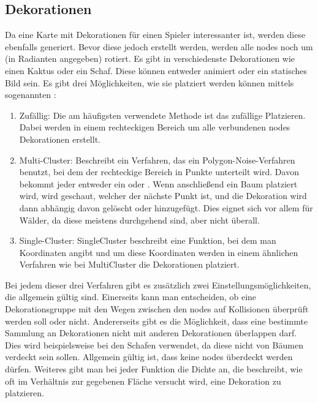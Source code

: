 \subsection{Dekorationen}\label{subsec:dekorationen}
Da eine Karte mit Dekorationen für einen Spieler interessanter ist, werden diese ebenfalls generiert.
Bevor diese jedoch erstellt werden, werden alle nodes noch um  (in Radianten angegeben) rotiert.
Es gibt in \FF verschiedenste Dekorationen wie einen Kaktus oder ein Schaf.
Diese können entweder animiert oder ein statisches Bild sein.
Es gibt drei Möglichkeiten, wie sie platziert werden können mittels sogenannten :
\begin{enumerate}
    \item Zufällig: Die am häufigsten verwendete Methode ist das zufällige Platzieren.
    Dabei werden in einem rechteckigen Bereich um alle verbundenen nodes Dekorationen erstellt.
    \item Multi-Cluster: Beschreibt ein Verfahren, das ein Polygon-Noise-Verfahren benutzt, bei dem der rechteckige Bereich in Punkte unterteilt wird.
    Davon bekommt jeder entweder ein  oder .
    Wenn anschließend ein Baum platziert wird, wird geschaut, welcher der nächste Punkt ist, und die Dekoration wird dann abhängig davon gelöscht oder hinzugefügt.
    Dies eignet sich vor allem für \zB Wälder, da diese meistens durchgehend sind, aber nicht überall.
    \item Single-Cluster: SingleCluster beschreibt eine Funktion, bei dem man Koordinaten angibt und um diese Koordinaten werden in einem ähnlichen Verfahren wie bei MultiCluster die Dekorationen platziert.
\end{enumerate}

Bei jedem dieser drei Verfahren gibt es zusätzlich zwei Einstellungsmöglichkeiten, die allgemein gültig sind.
Einerseits kann man entscheiden, ob eine Dekorationsgruppe mit den Wegen zwischen den nodes auf Kollisionen überprüft werden soll oder nicht.
Andererseits gibt es die Möglichkeit, dass eine bestimmte Sammlung an Dekorationen nicht mit anderen Dekorationen überlappen darf.
Dies wird beispielsweise bei den Schafen verwendet, da diese nicht von Bäumen verdeckt sein sollen.
Allgemein gültig ist, dass keine nodes überdeckt werden dürfen.
Weiteres gibt man bei jeder Funktion die Dichte an, die beschreibt, wie oft im Verhältnis zur gegebenen Fläche versucht wird, eine Dekoration zu platzieren.

\vfill
\pagebreak
